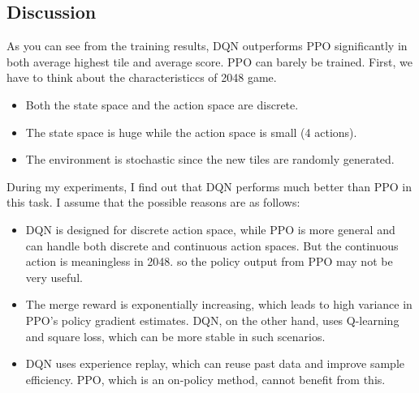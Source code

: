 \documentclass[a4paper]{article}
\begin{document}
\begin{answer}
    \subsection{Discussion}
    As you can see from the training results, DQN outperforms PPO significantly in both average highest tile and average score. PPO can barely be trained.
    First, we have to think about the characteristiccs of 2048 game. 
    \begin{itemize}
        \item Both the state space and the action space are discrete. 
        \item The state space is huge while the action space is small (4 actions).
        \item The environment is stochastic since the new tiles are randomly generated.
    \end{itemize}
    During my experiments, I find out that DQN performs much better than PPO in this task.
    I assume that the possible reasons are as follows:
    \begin{itemize}
        \item DQN is designed for discrete action space, while PPO is more general and can handle both discrete and continuous action spaces. But the continuous action is meaningless in 2048.
        so the policy output from PPO may not be very useful.
        \item The merge reward is exponentially increasing, which leads to high variance in PPO's policy gradient estimates. 
        DQN, on the other hand, uses Q-learning and square loss, which can be more stable in such scenarios.
        \item DQN uses experience replay, which can reuse past data and improve sample efficiency. PPO, which is an on-policy method, cannot benefit from this.
    \end{itemize}
    \end{answer}
\end{document}
